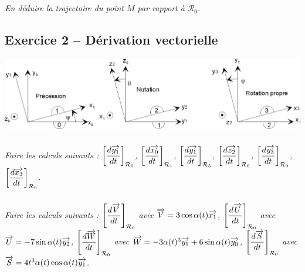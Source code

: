 \documentclass[10pt,oneside]{article}
\begin{document}
\subparagraph{}
\textit{En déduire la trajectoire du point $M$ par rapport à $\mathcal{R}_0$.}


\subsection*{Exercice 2 -- Dérivation vectorielle}
\setcounter{subparagraph}{0}

\begin{center}
\includegraphics[width=.95\textwidth]{png/fig1}
\end{center}

\subparagraph{}
\textit{Faire les calculs suivants : 
$\left[ \dfrac{d\overrightarrow{y_1}}{dt}\right]_{\mathcal{R}_0}$, 
$\left[ \dfrac{d\overrightarrow{x_0}}{dt}\right]_{\mathcal{R}_1}$, 
$\left[ \dfrac{d\overrightarrow{y_1}}{dt}\right]_{\mathcal{R}_3}$, 
$\left[ \dfrac{d\overrightarrow{z_2}}{dt}\right]_{\mathcal{R}_0}$, 
$\left[ \dfrac{d\overrightarrow{y_3}}{dt}\right]_{\mathcal{R}_0}$, 
$\left[ \dfrac{d\overrightarrow{x_3}}{dt}\right]_{\mathcal{R}_0}$.}
\subparagraph{}
\textit{Faire les calculs suivants : 
$\left[ \dfrac{d\overrightarrow{V}}{dt}\right]_{\mathcal{R}_0}$ avec $\overrightarrow{V} = 3\cos\alpha(t)\overrightarrow{x_1}$,
$\left[ \dfrac{d\overrightarrow{U}}{dt}\right]_{\mathcal{R}_0}$ avec $\overrightarrow{U} = -7\sin\alpha(t)\overrightarrow{y_2}$,
$\left[ \dfrac{d\overrightarrow{W}}{dt}\right]_{\mathcal{R}_0}$ avec $\overrightarrow{W} = -3\alpha(t)^3\overrightarrow{y_1}+6\sin\alpha(t)\overrightarrow{y_0}$,
$\left[ \dfrac{d\overrightarrow{S}}{dt}\right]_{\mathcal{R}_0}$ avec $\overrightarrow{S} = 4t^3\alpha(t)\cos\alpha(t)\overrightarrow{y_1}$.
}
\end{document}

